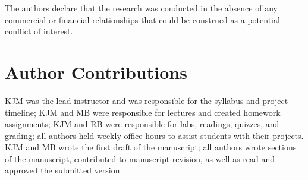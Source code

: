 The authors declare that the research was conducted in the absence of any commercial or financial relationships that could be construed as a potential conflict of interest.

\section*{Author Contributions}

KJM was the lead instructor and was responsible for the syllabus and project timeline;
KJM and MB were responsible for lectures and created homework assignments;
KJM and RB were responsible for labs, readings, quizzes, and grading;
all authors held weekly office hours to assist students with their projects.
KJM and MB wrote the first draft of the manuscript;
all authors wrote sections of the manuscript, contributed to manuscript revision, 
as well as read and approved the submitted version.
